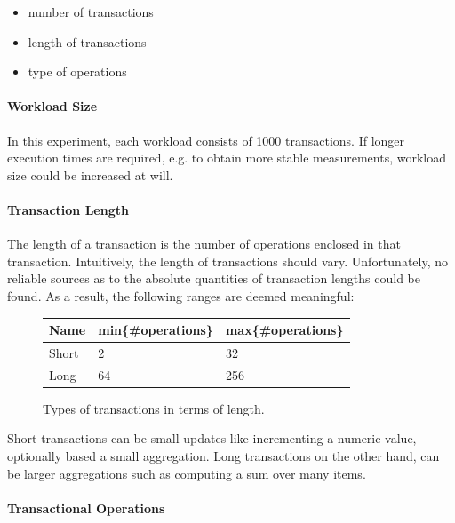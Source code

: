 \begin{itemize}
    \item number of transactions
    \item length of transactions
    \item type of operations
\end{itemize}

\paragraph{Workload Size}

In this experiment, each workload consists of 1000 transactions. If longer
execution times are required, e.g. to obtain more stable measurements, workload
size could be increased at will.

\paragraph{Transaction Length}

The length of a transaction is the number of operations enclosed in that
transaction. Intuitively, the length of transactions should vary. Unfortunately,
no reliable sources as to the absolute quantities of transaction lengths could
be found. As a result, the following ranges are deemed meaningful:

\begin{figure}[!h]
    \centering
    \begin{tabular}{|l|l|l|}
        \hline
        \textbf{Name} & \textbf{min\{\#operations\}} & \textbf{max\{\#operations\}} \\
        \hline
        \hline
        Short         & 2  & 32  \\
        Long          & 64 & 256 \\
        \hline
    \end{tabular}
    \caption{Types of transactions in terms of length.}
    \label{tab:tx-length}
\end{figure}

Short transactions can be small updates like incrementing a numeric value,
optionally based a small aggregation. Long transactions on the other hand, can
be larger aggregations such as computing a sum over many items.

\paragraph{Transactional Operations}

